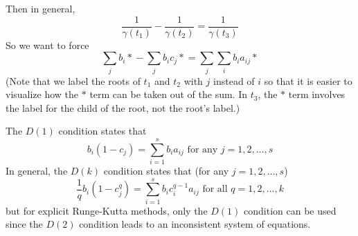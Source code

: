 \documentclass[12pt]{amsart}
\theoremstyle{definition}
\begin{document}
Then in general,
$$\frac{1}{\gamma(t_1)} - \frac{1}{\gamma(t_2)} = \frac{1}{\gamma(t_3)}$$
So we want to force
$$\sum_j{b_i*} - \sum_j{b_ic_j*} = \sum_j\sum_i{b_ia_{ij}*}$$
(Note that we label the roots of $t_1$ and $t_2$ with $j$ instead of $i$ so that it is easier to visualize how the $*$
term can be taken out of the sum. In $t_3$, the $*$ term involves the label for the child of the root, not the root's label.)

The $D(1)$ condition states that 
$$b_i(1 - c_j) = \sum_{i = 1}^s{b_ia_{ij}} \mbox{ for any } j = 1, 2, \dots, s$$ 
In general, the $D(k)$ condition states that (for any $j = 1, 2, \dots, s$)
$$\frac{1}{q}b_i(1 - c_j^q) = \sum_{i = 1}^s{b_i c_i^{q - 1}a_{ij}} \mbox{ for all } q = 1,2, \dots, k$$
but for explicit Runge-Kutta methods, only the $D(1)$ condition can be used since the $D(2)$ condition leads
to an inconsistent system of equations.
\end{document}
